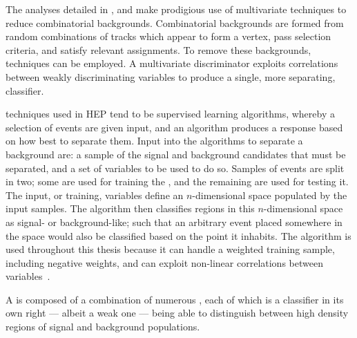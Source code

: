The analyses detailed in ,  and  make
prodigious use of multivariate techniques to reduce combinatorial backgrounds.
Combinatorial backgrounds are formed from random combinations of tracks which appear to form a
vertex, pass selection criteria, and satisfy relevant \pid assignments.
To remove these backgrounds, \MVA techniques can be employed.
A multivariate discriminator exploits correlations between weakly discriminating variables to
produce a single, more separating, classifier.


\MVA techniques used in \gls{HEP} tend to be supervised learning algorithms, whereby a selection of
events are given input, and an algorithm produces a response based on how best to separate them.
Input into the algorithms to separate a background are:
a sample of the signal and background candidates that must be
separated, and a set of variables to be used to do so.
Samples of events are split in two; some are used for training the \MVA, and the remaining are used
for testing it.
The input, or training, variables define an $n$-dimensional space populated by the input samples.
The algorithm then classifies regions in this $n$-dimensional space as signal- or background-like;
such that an arbitrary event placed somewhere in the space would also be classified based on the
point it inhabits.
The \BDT algorithm is used throughout this thesis because it can handle
a weighted training sample, including negative weights, and can exploit non-linear correlations
between variables~\cite{Breiman,Roe}.

A \BDT is composed of a combination of numerous \DTs, each of which is a classifier
in its own right
--- albeit a weak one ---
being able to distinguish between high density regions of signal and
background populations.

